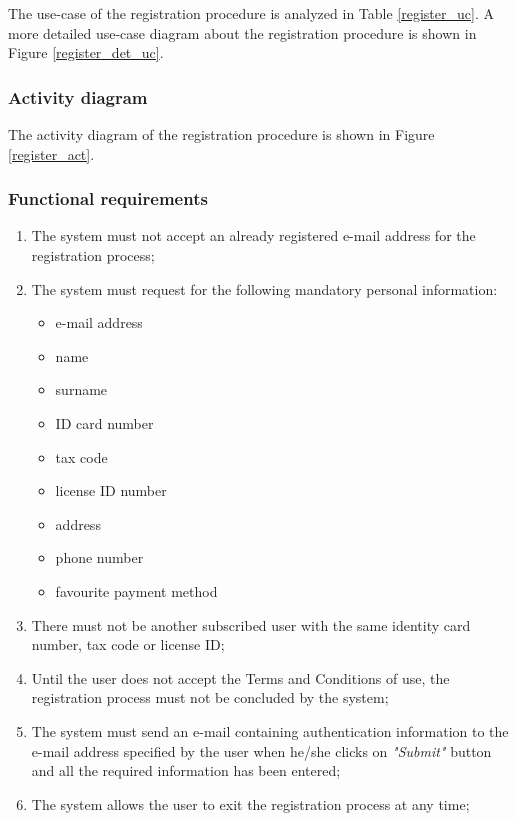 The use-case of the registration procedure is analyzed in Table \ref{register_uc}.
A more detailed use-case diagram about the registration procedure is shown in Figure \ref{register_det_uc}.

\subsubsection{Activity diagram}

The activity diagram of the registration procedure is shown in Figure \ref{register_act}.

\subsubsection{Functional requirements}
\begin{enumerate}
\item The system must not accept an already registered e-mail address for the registration process;
\item The system must request for the following mandatory personal information:
	\begin{itemize}
	\item e-mail address
	\item name
	\item surname
	\item ID card number
	\item tax code
	\item license ID number
	\item address
	\item phone number
	\item favourite payment method
	\end{itemize}
\item There must not be another subscribed user with the same identity card number, tax code or license ID;
\item Until the user does not accept the Terms and Conditions of use, the registration process must not be concluded by the system;
\item The system must send an e-mail containing authentication information to the e-mail address specified by the user when he/she clicks on \emph{"Submit"} button and all the required information has been entered;
\item The system allows the user to exit the registration process at any time;
\end{enumerate}

